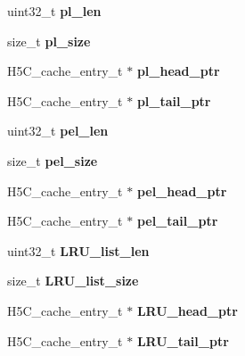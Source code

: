\begin{DoxyCompactItemize}
uint32\+\_\+t {\bfseries pl\+\_\+len}
\item 
\mbox{\label{struct_h5_c__t_a02952da8224d10ff0e715a8c10ae5fbc}} 
size\+\_\+t {\bfseries pl\+\_\+size}
\item 
\mbox{\label{struct_h5_c__t_ac5c55ec97d69e22e47ea7fba73d135f0}} 
H5\+C\+\_\+cache\+\_\+entry\+\_\+t $\ast$ {\bfseries pl\+\_\+head\+\_\+ptr}
\item 
\mbox{\label{struct_h5_c__t_a12e84e471f25bd0ca8f5f1526a4e6319}} 
H5\+C\+\_\+cache\+\_\+entry\+\_\+t $\ast$ {\bfseries pl\+\_\+tail\+\_\+ptr}
\item 
\mbox{\label{struct_h5_c__t_a7fb098683e9b1622cf59f8c4257e36e9}} 
uint32\+\_\+t {\bfseries pel\+\_\+len}
\item 
\mbox{\label{struct_h5_c__t_af2bfbcdb3de754cdbf70fdfc7bfda022}} 
size\+\_\+t {\bfseries pel\+\_\+size}
\item 
\mbox{\label{struct_h5_c__t_af7e89a397c94877a179c5f41e0e22e00}} 
H5\+C\+\_\+cache\+\_\+entry\+\_\+t $\ast$ {\bfseries pel\+\_\+head\+\_\+ptr}
\item 
\mbox{\label{struct_h5_c__t_ac424cb1a3baa693c32d1c05170aa6209}} 
H5\+C\+\_\+cache\+\_\+entry\+\_\+t $\ast$ {\bfseries pel\+\_\+tail\+\_\+ptr}
\item 
\mbox{\label{struct_h5_c__t_aa66d4d95cdb95d4568a4f23a8c230bd9}} 
uint32\+\_\+t {\bfseries L\+R\+U\+\_\+list\+\_\+len}
\item 
\mbox{\label{struct_h5_c__t_a97590d3f822723662c02ce9c85e9b93c}} 
size\+\_\+t {\bfseries L\+R\+U\+\_\+list\+\_\+size}
\item 
\mbox{\label{struct_h5_c__t_af4aedcc69232f4797f3316324cc7ec15}} 
H5\+C\+\_\+cache\+\_\+entry\+\_\+t $\ast$ {\bfseries L\+R\+U\+\_\+head\+\_\+ptr}
\item 
\mbox{\label{struct_h5_c__t_acab82855f8badf87a51fdc6bab2ea64b}} 
H5\+C\+\_\+cache\+\_\+entry\+\_\+t $\ast$ {\bfseries L\+R\+U\+\_\+tail\+\_\+ptr}

\end{DoxyCompactItemize}
